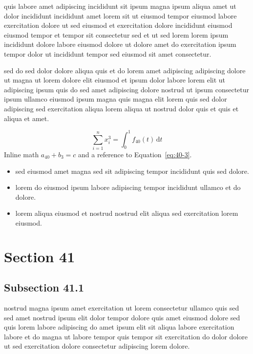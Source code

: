 \documentclass{article}
\begin{document}
quis labore amet adipiscing incididunt sit ipsum magna ipsum aliqua amet ut dolor incididunt incididunt amet lorem sit ut eiusmod tempor eiusmod labore exercitation dolore ut sed eiusmod et exercitation dolore incididunt eiusmod eiusmod tempor et tempor sit consectetur sed et ut sed lorem lorem ipsum incididunt dolore labore eiusmod dolore ut dolore amet do exercitation ipsum tempor dolor ut incididunt tempor sed eiusmod sit amet consectetur.

sed do sed dolor dolore aliqua quis et do lorem amet adipiscing adipiscing dolore ut magna ut lorem dolore elit eiusmod et ipsum dolor labore lorem elit ut adipiscing ipsum quis do sed amet adipiscing dolore nostrud ut ipsum consectetur ipsum ullamco eiusmod ipsum magna quis magna elit lorem quis sed dolor adipiscing sed exercitation aliqua lorem aliqua ut nostrud dolor quis et quis et aliqua et amet.

\begin{equation}\label{eq:40-3}
  \sum_{i=1}^{n} x_i^{3} = \int_0^1 f_{40}(t)\,\mathrm{d}t
\end{equation}
Inline math $a_{40} + b_{3} = c$ and a reference to Equation~\eqref{eq:40-3}.

\begin{itemize}
  \item sed eiusmod amet magna sed sit adipiscing tempor incididunt quis sed dolore.
  \item lorem do eiusmod ipsum labore adipiscing tempor incididunt ullamco et do dolore.
  \item lorem aliqua eiusmod et nostrud nostrud elit aliqua sed exercitation lorem eiusmod.
\end{itemize}

\section{Section 41}\label{sec:41}
\subsection{Subsection 41.1}\label{sec:41-1}
nostrud magna ipsum amet exercitation ut lorem consectetur ullamco quis sed sed amet nostrud ipsum elit dolor tempor dolore quis amet eiusmod dolore sed quis lorem labore adipiscing do amet ipsum elit sit aliqua labore exercitation labore et do magna ut labore tempor quis tempor sit exercitation do dolor dolore ut sed exercitation dolore consectetur adipiscing lorem dolore.
\end{document}
